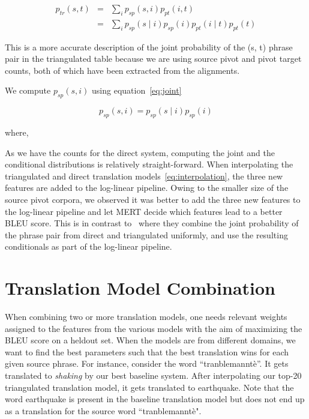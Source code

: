         \begin{eqnarray*}
                p_{tr}(s, t) &=& \sum_{i}p_{sp}(s, i) p_{pt}(i, t) \\
                                &=& \sum_{i}p_{sp}(s \mid i) p_{sp}(i) p_{pt}(i \mid t) p_{pt}(t)
        \end{eqnarray*}



This is a more accurate description of the joint probability of the (s, t) phrase pair in the triangulated table because we are using source pivot and pivot target counts, both of which have been extracted from the alignments.

We compute $p_{sp}(s, i)$ using equation~\eqref{eq:joint} 

\begin{equation} \label{eq:joint}
	p_{sp}(s, i) = p_{sp}(s \mid i) p_{sp}(i)
\end{equation}

	where, 

 As we have the counts for the direct system, computing the joint and the conditional distributions is relatively straight-forward. When interpolating the triangulated and direct translation models~\eqref{eq:interpolation}, the three new features are added to the log-linear pipeline. Owing to the smaller size of the source pivot corpora, we observed it was better to add the three new features to the log-linear pipeline and let MERT decide which features lead to a better BLEU score. This is in contrast to~\cite{Cohn:07} where they combine the joint probability of the phrase pair from direct and triangulated uniformly, and use the resulting conditionals as part of the log-linear pipeline.


\section{Translation Model Combination}
\label{sec:interpolation}
        When combining two or more translation models, one needs relevant weights assigned to the features from the various models with the aim of maximizing the BLEU score on a heldout set. When the models are from different domains, we want to find the best parameters such that the best translation wins for each given source phrase. For instance, consider the word ``tranblemannt\`e''. It gets translated to \emph{shaking} by our best baseline system. After interpolating our top-20 triangulated translation model, it gets translated to earthquake. Note that the word earthquake is present in the baseline translation model but does not end up as a translation for the source word ``tranblemannt\`e".

